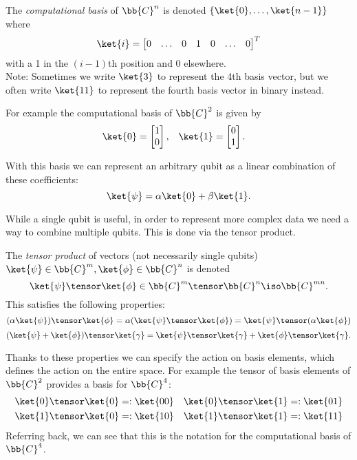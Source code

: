 \documentclass{article}
\begin{document}
        \begin{notation}
                The \textit{computational basis} of $\bb{C}^n$ is denoted $\{\ket{0}, \dots, \ket{n-1}\}$ where
                        $$\ket{i} = \begin{bmatrix} 0 & \dots & 0 & 1 & 0 & \dots & 0 \end{bmatrix}^T$$
                with a 1 in the $(i-1)$th position and 0 elsewhere.\\
                Note: Sometimes we write $\ket{3}$ to represent the 4th basis vector, but we often write $\ket{11}$ to represent the fourth basis vector in binary instead.
        \end{notation}
        For example the computational basis of $\bb{C}^2$ is given by
        \begin{align*}
        \ket{0} &= \begin{bmatrix} 1 \\ 0 \end{bmatrix}, & \ket{1} &= \begin{bmatrix} 0 \\ 1 \end{bmatrix}.
        \end{align*}

        With this basis we can represent an arbitrary qubit as a linear combination of these coefficients:
                $$\ket{\psi} = \alpha \ket{0} + \beta \ket{1}.$$

        While a single qubit is useful, in order to represent more complex data we need a way to combine multiple qubits.
        This is done via the tensor product.

        \begin{definition}
                The \textit{tensor product} of vectors (not necessarily single qubits) $\ket{\psi} \in \bb{C}^m, \ket{\phi} \in \bb{C}^n$ is denoted
                        $$\ket{\psi} \tensor \ket{\phi} \in \bb{C}^m \tensor \bb{C}^n \iso \bb{C}^{mn}.$$
                This satisfies the following properties:
                $$(\alpha \ket{\psi}) \tensor \ket{\phi} = \alpha (\ket{\psi} \tensor \ket{\phi}) = \ket{\psi} \tensor (\alpha \ket{\phi})$$
                $$(\ket{\psi} + \ket{\phi}) \tensor \ket{\gamma} = \ket{\psi} \tensor \ket{\gamma} + \ket{\phi} \tensor \ket{\gamma}.$$
        \end{definition}

        Thanks to these properties we can specify the action on basis elements, which defines the action on the entire space.
        For example the tensor of basis elements of $\bb{C}^2$ provides a basis for $\bb{C}^4$:
        \begin{align*}
        \ket{0} \tensor \ket{0} &=: \ket{00} & \ket{0} \tensor \ket{1} &=: \ket{01}\\
        \ket{1} \tensor \ket{0} &=: \ket{10} & \ket{1} \tensor \ket{1} &=: \ket{11}
        \end{align*}
        Referring back, we can see that this is the notation for the computational basis of $\bb{C}^4$.
\end{document}
